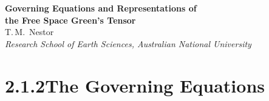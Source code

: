 \documentclass[11pt,a4paper]{article}
\begin{document}
\thispagestyle{plain}
\begin{center}
\vspace*{1em}
{\LARGE\bfseries Governing Equations and Representations of\\[0.3em]
the Free Space Green's Tensor}\\[1.8em]
{\large T.\,M.\ Nestor}\\[0.5em]
{\itshape Research School of Earth Sciences, Australian National University}\\[2em]
\end{center}

\noindent{}


\section*{2.1.2\quad The Governing Equations}
\end{document}
